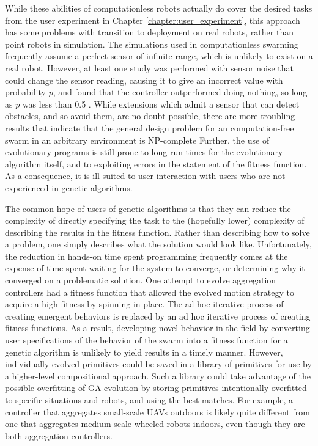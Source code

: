 While these abilities of computationless robots actually do cover the desired tasks from the user experiment in Chapter \ref{chapter:user_experiment}, this approach has some problems with transition to deployment on real robots, rather than point robots in simulation. 
The simulations used in computationless swarming frequently assume a perfect sensor of infinite range, which is unlikely to exist on a real robot.
However, at least one study was performed with sensor noise that could change the sensor reading, causing it to give an incorrect value with probability $p$, and found that the controller outperformed doing nothing, so long as $p$ was less than 0.5 \citep{gauci2014self}. 
While extensions which admit a sensor that can detect obstacles, and so avoid them, are no doubt possible, there are more troubling results that indicate that the general design problem for an computation-free swarm in an arbitrary environment is NP-complete \citep{wareham2018viable}
Further, the use of evolutionary programs is still prone to long run times for the evolutionary algorithm itself, and to exploiting errors in the statement of the fitness function. 
As a consequence, it is ill-suited to user interaction with users who are not experienced in genetic algorithms. 

The common hope of users of genetic algorithms is that they can reduce the complexity of directly specifying the task to the (hopefully lower) complexity of describing the results in the fitness function.
Rather than describing how to solve a problem, one simply describes what the solution would look like. 
Unfortunately, the reduction in hands-on time spent programming frequently comes at the expense of time spent waiting for the system to converge, or determining why it converged on a problematic solution. 
One attempt to evolve aggregation controllers had a fitness function that allowed the evolved motion strategy to acquire a high fitness by spinning in place.
The ad hoc iterative process of creating emergent behaviors is replaced by an ad hoc iterative process of creating fitness functions.
As a result, developing novel behavior in the field by converting user specifications of the behavior of the swarm into a fitness function for a genetic algorithm is unlikely to yield results in a timely manner. 
However, individually evolved primitives could be saved in a library of primitives for use by a higher-level compositional approach. 
Such a library could take advantage of the possible overfitting of GA evolution by storing primitives intentionally overfitted to specific situations and robots, and using the best matches. 
For example, a controller that aggregates small-scale UAVs outdoors is likely quite different from one that aggregates medium-scale wheeled robots indoors, even though they are both aggregation controllers. 

